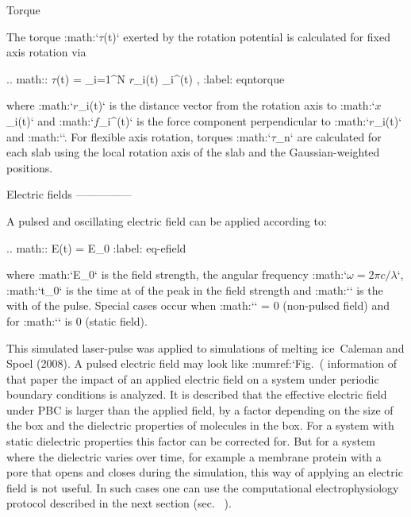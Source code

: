 Torque
^^^^^^

The torque :math:`{\mbox{\boldmath ${\tau}$}}(t)` exerted by the
rotation potential is calculated for fixed axis rotation via

.. math:: {\mbox{\boldmath ${\tau}$}}(t) = \sum_{i=1}^{N} {\mbox{\boldmath ${r}$}}_i(t) _{\!i}^\perp(t) ,
          :label: eqntorque

where :math:`{\mbox{\boldmath ${r}$}}_i(t)` is the distance vector from
the rotation axis to :math:`{\mbox{\boldmath ${x}$}}_i(t)` and
:math:`{\mbox{\boldmath ${f}$}}_{\!i}^\perp(t)` is the force component
perpendicular to :math:`{\mbox{\boldmath ${r}$}}_i(t)` and
:math:``. For flexible axis rotation,
torques :math:`{\mbox{\boldmath ${\tau}$}}_{\!n}` are calculated for
each slab using the local rotation axis of the slab and the
Gaussian-weighted positions.

Electric fields
---------------

A pulsed and oscillating electric field can be applied according to:

.. math:: E(t) = E_0 \exp{}\cos{}
          :label: eq-efield

where :math:`E_0` is the field strength, the angular frequency
:math:`{\mbox{$\omega = 2\pi c/\lambda$}}`, :math:`t_0` is the time
at of the peak in the field strength and :math:`\sigma` is the with of
the pulse. Special cases occur when :math:`\sigma` = 0 (non-pulsed
field) and for :math:`\omega` is 0 (static field).

This simulated laser-pulse was applied to
simulations of melting ice Caleman and Spoel (2008). A pulsed electric
field may look like :numref:`Fig. (%
information of that paper the impact of an applied electric field on a
system under periodic boundary conditions is analyzed. It is described
that the effective electric field under PBC is larger than the applied
field, by a factor depending on the size of the box and the dielectric
properties of molecules in the box. For a system with static dielectric
properties this factor can be corrected for. But for a system where the
dielectric varies over time, for example a membrane protein with a pore
that opens and closes during the simulation, this way of applying an
electric field is not useful. In such cases one can use the
computational electrophysiology protocol described in the next section
(sec. 
).


